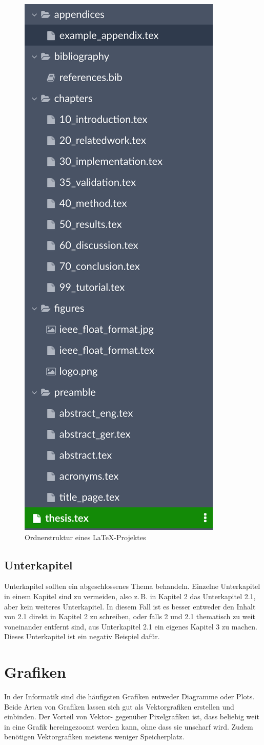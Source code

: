 \begin{figure}
    \centering
    \includegraphics[width=0.4\linewidth]{figures/folderstructure.png}
    \caption{Ordnerstruktur eines LaTeX-Projektes}
    \label{fig:folderstructure}
\end{figure}

\subsection{Unterkapitel}
Unterkapitel sollten ein abgeschlossenes Thema behandeln. Einzelne Unterkapitel in einem Kapitel sind zu vermeiden, also z.\,B. in Kapitel 2 das Unterkapitel 2.1, aber kein weiteres Unterkapitel. In diesem Fall ist es besser entweder den Inhalt von 2.1 direkt in Kapitel 2 zu schreiben, oder falls 2 und 2.1 thematisch zu weit voneinander entfernt sind, aus Unterkapitel 2.1 ein eigenes Kapitel 3 zu machen. Dieses Unterkapitel ist ein negativ Beispiel dafür. 

\section{Grafiken}
In der Informatik sind die häufigsten Grafiken entweder Diagramme oder Plots. Beide Arten von Grafiken lassen sich gut als Vektorgrafiken erstellen und einbinden. Der Vorteil von Vektor- gegenüber Pixelgrafiken ist, dass beliebig weit in eine Grafik hereingezoomt werden kann, ohne dass sie unscharf wird. Zudem benötigen Vektorgrafiken meistens weniger Speicherplatz.

